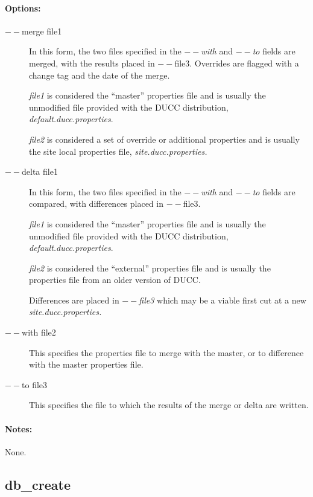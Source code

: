     \paragraph{Options:}
    \begin{description}
        \item[$--$merge file1]          
          In this form, the two files specified in the {\em $--$with} and {\em$--$to} fields are merged, with the
          results placed in $--$file3.  Overrides are flagged with a change tag and the date of the merge.

          {\em file1} is considered the ``master'' properties file and is usually the unmodified file provided
          with the DUCC distribution, {\em default.ducc.properties}.

          {\em file2} is considered a set of override or additional properties and is usually the site local
          properties file, {\em site.ducc.properties.}

        \item[$--$delta file1]
          In this form, the two files specified in the {\em $--$with} and {\em$--$to} fields are compared, with
          differences placed in $--$file3.

          {\em file1} is considered the ``master'' properties file and is usually the unmodified file provided
          with the DUCC distribution, {\em default.ducc.properties}.
          
          {\em file2} is considered the ``external'' properties file and is usually the properties file from
          an older version of DUCC.  

          Differences are placed in {\em $--$file3} which may be a viable first cut at a new {\em site.ducc.properties.}

          \item[$--$with file2] This specifies the properties file to merge with the master, or to difference
            with the master properties file.

          \item[$--$to file3] This specifies the file to which the results of the merge or delta are written.
     \end{description}
        
    \paragraph{Notes:}
    None.

\subsection{db\_create}
\label{subsec:admin.db-create}

